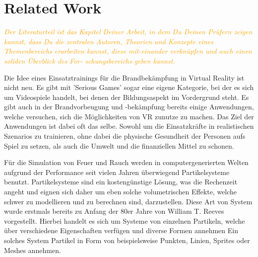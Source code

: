 \section{Related Work}

\emph{
    \textcolor{orange}{
        Der Literaturteil ist das Kapitel Deiner Arbeit, in dem Du Deinen Prüfern zeigen kannst, dass Du die zentralen Autoren, Theorien und Konzepte eines Themenbereichs erarbeiten kannst, diese mit-einander verknüpfen und auch einen soliden Überblick des For- schungsbereichs geben kannst.
    }
}


Die Idee eines Einsatztrainings für die Brandbekämpfung in Virtual Reality ist nicht neu. Es gibt mit
'Serious Games' sogar eine eigene Kategorie, bei der es sich um Videospiele handelt, bei denen der
Bildungsaspekt im Vordergrund steht. Es gibt auch in der Brandvorbeugung und -bekämpfung bereits einige Anwendungen, 
welche versuchen, sich die Möglichkeiten von VR zunutze zu machen.
Das Ziel der Anwendungen ist dabei oft das selbe. Sowohl um die Einsatzkräfte in realistischen Szenarios zu trainieren, 
ohne dabei die physische Gesundheit der Personen aufs Spiel zu setzen, als auch die Umwelt und die finanziellen Mittel zu schonen.


Für die Simulation von Feuer und Rauch werden in computergenerierten Welten aufgrund der Performance seit vielen Jahren überwiegend 
Partikelsysteme benutzt. Partikelsysteme sind ein kostengünstige Lösung, was die Rechenzeit angeht und eignen sich daher um eben solche 
volumetrischen Effekte, welche schwer zu modellieren und zu berechnen sind, darzustellen.
Diese Art von System wurde erstmals bereits zu Anfang der 80er Jahre von William T. Reeves vorgestellt. \parencite{Reeves1983}
Hierbei handelt es sich um Systeme von einzelnen Partikeln, welche über verschiedene Eigenschaften verfügen und diverse Formen annehmen
Ein solches System Partikel in Form von beispielsweise Punkten, Linien, Sprites oder Meshes annehmen.






\parencite{Bukowski1997} 





